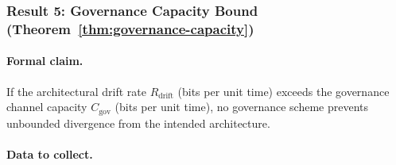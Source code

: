 \documentclass[11pt, a4paper]{googledeepmind}
\begin{document}
\subsubsection{Result 5: Governance Capacity Bound (Theorem~\ref{thm:governance-capacity})}

\paragraph{Formal claim.} If the architectural drift rate $R_{\text{drift}}$ (bits per unit time) exceeds the governance channel capacity $C_{\text{gov}}$ (bits per unit time), no governance scheme prevents unbounded divergence from the intended architecture.

\paragraph{Data to collect.}
\end{document}
